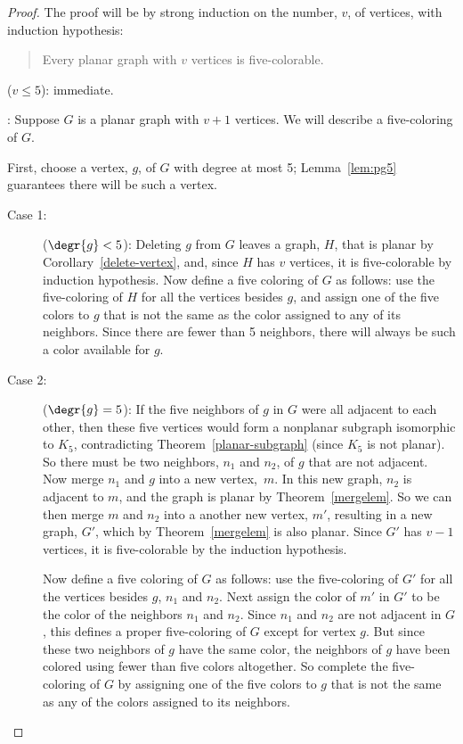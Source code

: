 \begin{proof}
The proof will be by strong induction on the number, $v$, of vertices, with
induction hypothesis:
\begin{quote}
Every planar graph with $v$ vertices is five-colorable.
\end{quote}

 ($v \leq 5$): immediate.

: Suppose $G$ is a planar graph with
$v+1$ vertices.  We will describe a five-coloring of $G$.

First, choose a vertex, $g$, of $G$ with degree at most 5;
Lemma~\ref{lem:pg5} guarantees there will be such a vertex.
\begin{description}

\item[Case 1:] ($\degr{g}<5$): Deleting $g$ from $G$ leaves a graph,
$H$, that is planar by Corollary~\ref{delete-vertex}, and, since $H$
has $v$ vertices, it is five-colorable by induction hypothesis.  Now
define a five coloring of $G$ as follows: use the five-coloring of $H$
for all the vertices besides $g$, and assign one of the five colors to
$g$ that is not the same as the color assigned to any of its
neighbors.  Since there are fewer than 5 neighbors, there will always
be such a color available for $g$.

\item[Case 2:] ($\degr{g}=5$): If the five neighbors of $g$ in $G$
  were all adjacent to each other, then these five vertices would form
  a nonplanar subgraph isomorphic to $K_5$, contradicting
  Theorem~\ref{planar-subgraph} (since $K_5$ is not planar).  So there
  must be two neighbors, $n_1$ and $n_2$, of $g$ that are not
  adjacent.  Now merge $n_1$ and $g$ into a new vertex,~$m$.  In this
  new graph, $n_2$ is adjacent to $m$, and the graph is planar by
  Theorem~\ref{mergelem}.  So we can then merge $m$ and $n_2$ into a
  another new vertex, $m'$, resulting in a new graph, $G'$, which by
  Theorem~\ref{mergelem} is also planar.  Since $G'$ has $v-1$
  vertices, it is five-colorable by the induction hypothesis.

  Now define a five coloring of $G$ as follows: use the five-coloring of $G'$
  for all the vertices besides $g$, $n_1$ and $n_2$.  Next assign the
  color of $m'$ in $G'$ to be the color of the neighbors $n_1$ and $n_2$.
  Since $n_1$ and $n_2$ are not adjacent in $G$, this defines a proper
  five-coloring of $G$ except for vertex $g$.  But since these two
  neighbors of $g$ have the same color, the neighbors of $g$ have been
  colored using fewer than five colors altogether.  So complete the
  five-coloring of $G$ by assigning one of the five colors to $g$ that is
  not the same as any of the colors assigned to its neighbors.
\end{description}

\end{proof}

